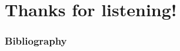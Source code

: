 \documentclass[10pt]{beamer}
\begin{document}
\section*{Thanks for listening!}

\begin{frame}[allowframebreaks]
    \frametitle{Bibliography}
     \printbibliography
    \end{frame}




    
        
\end{document}
